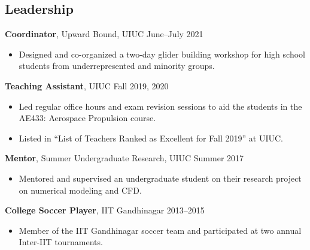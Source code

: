 \documentclass[margin]{res}
\begin{document}
\begin{resume}


\section{\large Leadership}
{\bf Coordinator}, Upward Bound, UIUC \hfill June--July 2021
\begin{itemize}
	\item Designed and co-organized a two-day glider building workshop for high school students from underrepresented and minority groups.
\end{itemize}

{\bf Teaching Assistant}, UIUC \hfill Fall 2019, 2020
\begin{itemize}
	\item Led regular office hours and exam revision sessions to aid the students in the AE433: Aerospace Propulsion course.
	\item Listed in ``List of Teachers Ranked as Excellent for Fall 2019'' at UIUC.
\end{itemize}


{\bf Mentor}, Summer Undergraduate Research, UIUC \hfill Summer 2017 
\begin{itemize}
	\item Mentored and supervised an undergraduate student on their research project on numerical modeling and CFD.
\end{itemize}


{\bf College Soccer Player}, IIT Gandhinagar \hfill 2013--2015
\begin{itemize}
	\item Member of the IIT Gandhinagar soccer team and participated at two annual Inter-IIT tournaments.
\end{itemize}


\end{resume}
\end{document}
